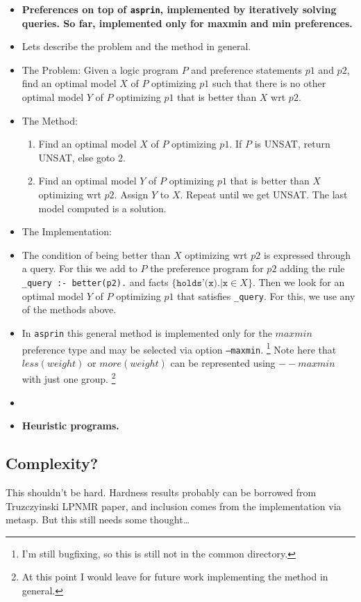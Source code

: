 \documentclass[a4paper,10pt]{article}
\begin{document}
\begin{itemize}
\item
\textbf{Preferences on top of \texttt{asprin}, implemented by iteratively solving queries. 
        So far, implemented only for maxmin and min preferences.}
\item
Lets describe the problem and the method in general.
\item
The Problem: 
Given a logic program $P$ and preference statements $p1$ and $p2$, 
find an optimal model $X$ of $P$ optimizing $p1$ such that there is no other
optimal model $Y$ of $P$ optimizing $p1$ that is better than $X$ wrt $p2$. 
\item
The Method:
    \begin{enumerate}
    \item
    Find an optimal model $X$ of $P$ optimizing $p1$. If $P$ is UNSAT, return UNSAT, else goto 2.
    \item
    Find an optimal model $Y$ of $P$ optimizing $p1$ that is better than $X$ optimizing wrt $p2$.
    Assign $Y$ to $X$. 
    Repeat until we get UNSAT.
    The last model computed is a solution.
    \end{enumerate}
\item
The Implementation:
\item
The condition of being better than $X$ optimizing wrt $p2$ is expressed through a query.  
For this we add to $P$ the preference program for $p2$ adding the rule
\texttt{\_query :- better(p2).} and
facts $\{ \texttt{holds'(x).} | \texttt{x} \in X \}$.
Then we look for an optimal model $Y$ of $P$ optimizing $p1$ that satisfies \texttt{\_query}.
For this, we use any of the methods above.
\item
In \texttt{asprin} this general method is implemented only for the $maxmin$ preference type 
and may be selected via option \texttt{--maxmin}.
\footnote{I'm still bugfixing, so this is still not in the common directory.}
Note here that $less(weight)$ or $more(weight)$ can be represented using $--maxmin$ with just one group.
\footnote{At this point I would leave for future work implementing the method in general.}

\item
\item
\textbf{Heuristic programs.}

\end{itemize}

\subsection{Complexity?}
This shouldn't be hard. 
Hardness results probably can be borrowed from Truzczyinski LPNMR paper, 
and inclusion comes from the implementation via metasp. 
But this still needs some thought\ldots
\end{document}
